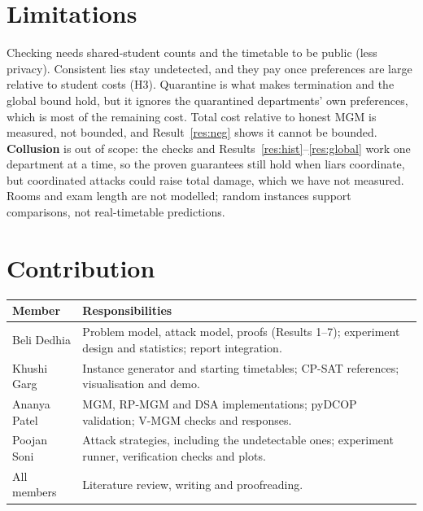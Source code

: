 \documentclass{article}
\theoremstyle{definition}
\newcommand{\1}{\mathbf{1}}
\begin{document}
\section{Limitations}
\label{sec:limits}
Checking needs shared-student counts and the timetable to be public (less privacy). Consistent lies stay undetected, and they pay once preferences are large relative to student costs (H3). Quarantine is what makes termination and the global bound hold, but it ignores the quarantined departments' own preferences, which is most of the remaining cost. Total cost relative to honest MGM is measured, not bounded, and Result~\ref{res:neg} shows it cannot be bounded. \textbf{Collusion} is out of scope: the checks and Results~\ref{res:hist}--\ref{res:global} work one department at a time, so the proven guarantees still hold when liars coordinate, but coordinated attacks could raise total damage, which we have not measured. Rooms and exam length are not modelled; random instances support comparisons, not real-timetable predictions.

\section{Contribution}
\vspace{-0.6em}
\begin{table}[H]
\centering\footnotesize
\begin{tabularx}{\linewidth}{@{}lX@{}}
\toprule
Member & Responsibilities \\
\midrule
Beli Dedhia & Problem model, attack model, proofs (Results 1--7); experiment design and statistics; report integration. \\
Khushi Garg & Instance generator and starting timetables; CP-SAT references; visualisation and demo. \\
Ananya Patel & MGM, RP-MGM and DSA implementations; pyDCOP validation; V-MGM checks and responses. \\
Poojan Soni & Attack strategies, including the undetectable ones; experiment runner, verification checks and plots. \\
All members & Literature review, writing and proofreading. \\
\bottomrule
\end{tabularx}
\end{table}
\end{document}
